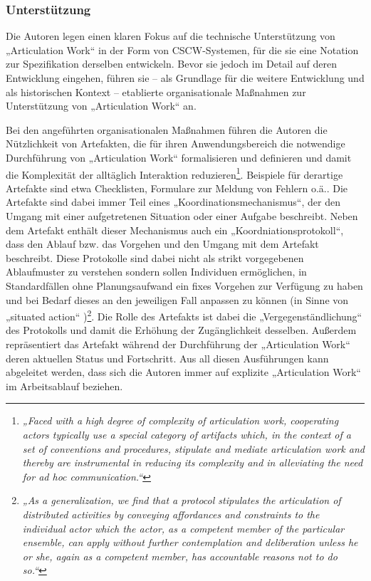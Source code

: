 \subsubsection{Unterstützung}

Die Autoren legen einen klaren Fokus auf die technische Unterstützung von „Articulation Work“ in der Form von \gls{CSCW}-Systemen, für die sie eine Notation zur Spezifikation derselben entwickeln. Bevor sie jedoch im Detail auf deren Entwicklung eingehen, führen sie -- als Grundlage für die weitere Entwicklung und als historischen Kontext -- etablierte organisationale Maßnahmen zur Unterstützung von „Articulation Work“ an.

Bei den angeführten organisationalen Maßnahmen führen die Autoren die Nützlichkeit von Artefakten, die für ihren Anwendungsbereich die notwendige Durchführung von „Articulation Work“ formalisieren und definieren und damit die Komplexität der alltäglich Interaktion reduzieren\footnote{\emph{„Faced with a high degree of complexity of articulation work, cooperating actors typically use a special category of artifacts which, in the context of a set of conventions and procedures, stipulate and mediate articulation work and thereby are instrumental in reducing its complexity and in alleviating the need for ad hoc communication.“}\citep[][S. 159]{Schmidt96}}. Beispiele für derartige Artefakte sind etwa Checklisten, Formulare zur Meldung von Fehlern o.ä.. Die Artefakte sind dabei immer Teil eines „Koordinationsmechanismus“, der den Umgang mit einer aufgetretenen Situation oder einer Aufgabe beschreibt. Neben dem Artefakt enthält dieser Mechanismus auch ein „Koordniationsprotokoll“, dass den Ablauf bzw. das Vorgehen und den Umgang mit dem Artefakt beschreibt. Diese Protokolle sind dabei nicht als strikt vorgegebenen Ablaufmuster zu verstehen sondern sollen Individuen ermöglichen, in Standardfällen ohne Planungsaufwand ein fixes Vorgehen zur Verfügung zu haben und bei Bedarf dieses an den jeweiligen Fall anpassen zu können (in Sinne von „situated action“ \citep{Suchman87})\footnote{\emph{„As a generalization, we find that a protocol stipulates the articulation of distributed activities by conveying affordances and constraints to the individual actor which the actor, as a competent member of the particular ensemble, can apply without further contemplation and deliberation unless he or she, again as a competent member, has accountable reasons not to do so.“}\citep[][S. 173]{Schmidt96}}. Die Rolle des Artefakts ist dabei die „Vergegenständlichung“ des Protokolls und damit die Erhöhung der Zugänglichkeit desselben. Außerdem repräsentiert das Artefakt während der Durchführung der „Articulation Work“ deren aktuellen Status und Fortschritt. Aus all diesen Ausführungen kann abgeleitet werden, dass sich die Autoren immer auf explizite „Articulation Work“ im Arbeitsablauf beziehen.

